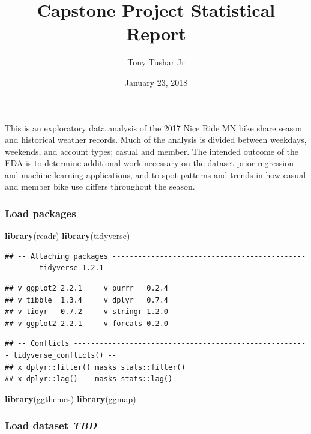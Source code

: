 \documentclass[]{article}
\title{Capstone Project Statistical Report}
\author{Tony Tushar Jr}
\date{January 23, 2018}
\newenvironment{Shaded}{\begin{snugshade}}{\end{snugshade}}
\newcommand{\KeywordTok}[1]{\textcolor[rgb]{0.13,0.29,0.53}{\textbf{#1}}}
\newcommand{\NormalTok}[1]{#1}
\begin{document}
\maketitle

This is an exploratory data analysis of the 2017 Nice Ride MN bike share
season and historical weather records. Much of the analysis is divided
between weekdays, weekends, and account types; casual and member. The
intended outcome of the EDA is to determine additional work necessary on
the dataset prior regression and machine learning applications, and to
spot patterns and trends in how casual and member bike use differs
throughout the season.

\subsubsection{Load packages}\label{load-packages}

\begin{Shaded}
\begin{Highlighting}[]
\KeywordTok{library}\NormalTok{(readr)}
\KeywordTok{library}\NormalTok{(tidyverse)}
\end{Highlighting}
\end{Shaded}

\begin{verbatim}
## -- Attaching packages ---------------------------------------------------- tidyverse 1.2.1 --
\end{verbatim}

\begin{verbatim}
## v ggplot2 2.2.1     v purrr   0.2.4
## v tibble  1.3.4     v dplyr   0.7.4
## v tidyr   0.7.2     v stringr 1.2.0
## v ggplot2 2.2.1     v forcats 0.2.0
\end{verbatim}

\begin{verbatim}
## -- Conflicts ------------------------------------------------------- tidyverse_conflicts() --
## x dplyr::filter() masks stats::filter()
## x dplyr::lag()    masks stats::lag()
\end{verbatim}

\begin{Shaded}
\begin{Highlighting}[]
\KeywordTok{library}\NormalTok{(ggthemes)}
\KeywordTok{library}\NormalTok{(ggmap)}
\end{Highlighting}
\end{Shaded}

\subsubsection{\texorpdfstring{Load dataset
\emph{TBD}}{Load dataset TBD}}\label{load-dataset-tbd}
\end{document}
